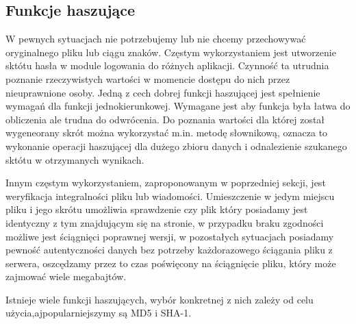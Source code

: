 \subsection{Funkcje haszujące}
\label{sec:hashfunction}

W pewnych sytuacjach nie potrzebujemy lub nie chcemy przechowywać oryginalnego pliku lub ciągu znaków. Częstym wykorzystaniem jest utworzenie sktótu hasła w module logowania do różnych aplikacji. Czynność ta utrudnia poznanie rzeczywistych wartości w momencie dostępu do nich przez nieuprawnione osoby. Jedną z cech dobrej funkcji haszującej jest
spełnienie wymagań dla funkcji jednokierunkowej. Wymagane jest aby funkcja była łatwa do obliczenia ale trudna do odwrócenia.
Do poznania wartości dla której został wygeneorany skrót można wykorzystać m.in. metodę słownikową, oznacza to wykonanie operacji haszującej dla dużego zbioru danych i odnalezienie szukanego sktótu w otrzymanych wynikach.

Innym częstym wykorzystaniem, zaproponowanym w poprzedniej sekcji, jest weryfikacja integralności pliku lub wiadomości. Umieszczenie w jedym miejscu pliku i jego skrótu umożliwia sprawdzenie czy plik który posiadamy jest identyczny z tym znajdującym się na stronie, w przypadku braku zgodności możliwe jest ściągnięci poprawnej wersji, w pozostałych sytuacjach posiadamy pewność autentyczności danych bez potrzeby każdorazowego ściągania pliku z serwera, oszcędzamy przez to czas poświęcony na ściągnięcie pliku, który może zajmować wiele megabajtów.

Istnieje wiele funkcji haszujących, wybór konkretnej z nich zależy od celu użycia,ajpopularniejszymy są MD5 i SHA-1.

